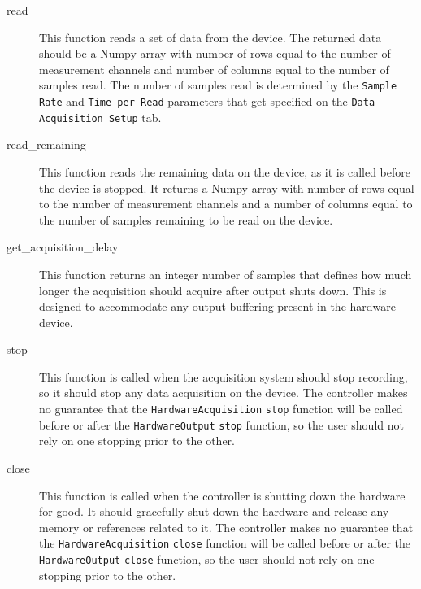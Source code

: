 \documentclass[pdf,12pt,report]{SANDreport}
\newcommand{\inlineCode}{\lstinline[basicstyle=\bfseries\ttfamily]}
\begin{document}
\begin{description}
        \item[read] This function reads a set of data from the device.  The returned data should be a Numpy array with number of rows equal to the number of measurement channels and number of columns equal to the number of samples read.  The number of samples read is determined by the \inlineCode{Sample Rate} and \inlineCode{Time per Read} parameters that get specified on the \inlineCode{Data Acquisition Setup} tab.
        \item[read\_remaining] This function reads the remaining data on the device, as it is called before the device is stopped.  It returns a Numpy array with number of rows equal to the number of measurement channels and a number of columns equal to the number of samples remaining to be read on the device.
        \item[get\_acquisition\_delay]  This function returns an integer number of samples that defines how much longer the acquisition should acquire after output shuts down.  This is designed to accommodate any output buffering present in the hardware device.
        \item[stop] This function is called when the acquisition system should stop recording, so it should stop any data acquisition on the device.  The controller makes no guarantee that the \inlineCode{HardwareAcquisition} \inlineCode{stop} function will be called before or after the \inlineCode{HardwareOutput} \inlineCode{stop} function, so the user should not rely on one stopping prior to the other.
        \item[close] This function is called when the controller is shutting down the hardware for good.  It should gracefully shut down the hardware and release any memory or references related to it.  The controller makes no guarantee that the \inlineCode{HardwareAcquisition} \inlineCode{close} function will be called before or after the \inlineCode{HardwareOutput} \inlineCode{close} function, so the user should not rely on one stopping prior to the other.
    \end{description}
    
\end{document}

